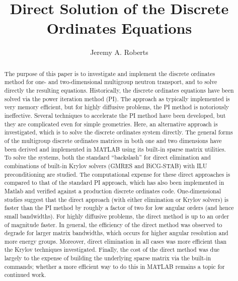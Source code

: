 \documentclass[final,3p,times,11pt]{elsarticle}
\begin{document}
\begin{frontmatter}


\title{Direct Solution of the Discrete Ordinates Equations}


\author[primary]{Jeremy A. Roberts}
\address[primary]{Massachusetts Institute of Technology,
                  77 Massachusetts Avenue, Cambridge, MA 02139-4307}

\pagebreak

\begin{abstract}
{\small
The purpose of this paper is to investigate and implement the discrete ordinates method for one- and two-dimensional multigroup neutron transport, and to solve directly the resulting equations.  Historically, the discrete ordinates equations have been solved via the power iteration method (PI).  The approach as typically implemented is very memory efficient, but for highly diffusive problems, the PI method is notoriously ineffective.  Several techniques to accelerate the PI method have been developed, but they are complicated even for simple geometries.  Here, an alternative approach is investigated, which is to solve the discrete ordinates system directly.  The general forms of the multigroup discrete ordinates matrices in both one and two dimensions have been derived and implemented in MATLAB using its built-in sparse matrix utilities.  To solve the systems, both the standard ``backslash'' for direct elimination and combinations of built-in Krylov solvers (GMRES and BiCG-STAB) with ILU preconditioning are studied.  The computational expense for these direct approaches is compared to that of the standard PI approach, which has also been implemented in Matlab and verified against a production discrete ordinates code.  One-dimensional studies suggest that the direct approach (with either elimination or Krylov solvers) is faster than the PI method by roughly a factor of two for low angular orders (and hence small bandwidths).  For highly diffusive problems, the direct method is up to an order of magnitude faster.  In general, the efficiency of the direct method was observed to degrade for larger matrix bandwidths, which occurs for higher angular resolution and more energy groups.  Moreover, direct elimination in all cases was more efficient than the Krylov techniques investigated.  Finally, the cost of the direct method was due largely to the expense of building the underlying sparse matrix via the built-in commands; whether a more efficient way to do this in MATLAB remains a topic for continued work.}
\end{abstract}


\end{frontmatter}
\end{document}
